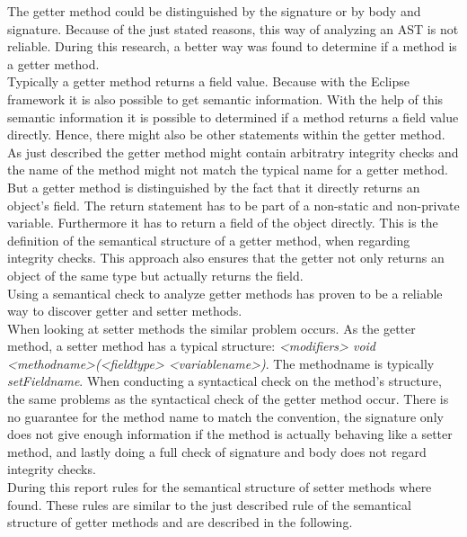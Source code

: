 The getter method could be distinguished by the signature or by body and signature. Because of the just stated reasons, this way of analyzing an \acf{AST} is not reliable. During this research, a better way was found to determine if a method is a getter method. 
\\

Typically a getter method returns a field value. Because with the Eclipse framework it is also possible to get semantic information. With the help of this semantic information it is possible to determined if a method returns a field value directly. Hence, there might also be other statements within the getter method. 
\\

As just described the getter method might contain arbitratry integrity checks and the name of the method might not match the typical name for a getter method. But a getter method is distinguished by the fact that it directly returns an object's field. The return statement has to be part of a non-static and non-private variable. Furthermore it has to return a field of the object directly. This is the definition of the semantical structure of a getter method, when regarding integrity checks. This approach also ensures that the getter not only returns an object of the same type but actually returns the field. 
\\

Using a semantical check to analyze getter methods has proven to be a reliable way to discover getter and setter methods.
\\

When looking at setter methods the similar problem occurs. As the getter method, a setter method has a typical structure: \textit{<modifiers> void <methodname>(<fieldtype> <variablename>)}. The methodname is typically \textit{setFieldname}. When conducting a syntactical check on the method's structure, the same problems as the syntactical check of the getter method occur. There is no guarantee for the method name to match the convention, the signature only does not give enough information if the method is actually behaving like a setter method, and lastly doing a full check of signature and body does not regard integrity checks.
\\

During this report rules for the semantical structure of setter methods where found. These rules are similar to the just described rule of the semantical structure of getter methods and are described in the following.
\\

